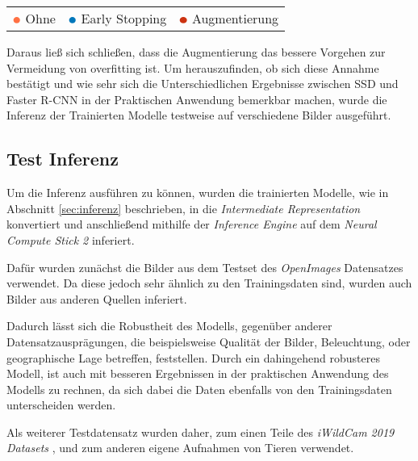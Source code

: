 \begin{table}[htb]
  \centering
  \begin{tabular}{m{}<{\centering}
                  m{}<{\centering}
                  m{}<{\centering}}
      $\color[HTML]{FF7043}\medbullet$  Ohne 
    & $\color[HTML]{0077BB}\medbullet$  Early Stopping 
    & $\color[HTML]{CC3311}\medbullet$  Augmentierung
  \end{tabular}    
\end{table}


Daraus ließ sich schließen, dass die Augmentierung das 
bessere Vorgehen zur Vermeidung von \Gls{overfitting} ist.
Um herauszufinden, ob sich diese Annahme bestätigt 
und wie sehr sich die Unterschiedlichen Ergebnisse
zwischen SSD und Faster R-CNN in der Praktischen Anwendung
bemerkbar machen, wurde die Inferenz der
Trainierten Modelle testweise auf verschiedene Bilder
ausgeführt.


\subsection{Test Inferenz}\label{sec:test_inferenz}

Um die Inferenz ausführen zu 
können, wurden die trainierten Modelle, wie in Abschnitt
\ref{sec:inferenz} beschrieben, 
in die \textit{Intermediate Representation} konvertiert 
und anschließend mithilfe der \textit{Inference Engine} auf 
dem \textit{Neural Compute Stick 2} inferiert.

Dafür wurden zunächst die Bilder aus dem Testset des
\textit{OpenImages} Datensatzes verwendet. Da diese jedoch 
sehr ähnlich zu den Trainingsdaten sind, wurden 
auch Bilder aus anderen Quellen inferiert.

Dadurch lässt sich die Robustheit des Modells, 
gegenüber anderer Datensatzausprägungen, die beispielsweise 
Qualität der Bilder, Beleuchtung, oder geographische Lage 
betreffen, feststellen.
Durch ein dahingehend robusteres Modell, ist auch 
mit besseren Ergebnissen in der praktischen Anwendung 
des Modells zu rechnen, da sich dabei die Daten 
ebenfalls von den Trainingsdaten unterscheiden werden.

Als weiterer Testdatensatz wurden daher, zum einen Teile des
\textit{iWildCam 2019 Datasets} \cite{beery2019iwildcam},
und zum anderen eigene Aufnahmen von Tieren 
verwendet.


